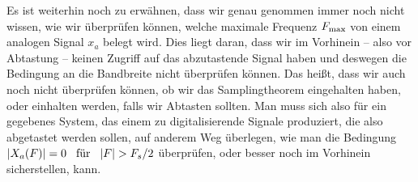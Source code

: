 Es ist weiterhin noch zu erwähnen, dass wir genau genommen immer noch nicht wissen, wie wir überprüfen können, welche maximale Frequenz $F_{\rm max}$ von einem analogen Signal $x_a$ belegt wird.
Dies liegt daran, dass wir im Vorhinein -- also vor Abtastung -- keinen Zugriff auf das abzutastende Signal haben und deswegen die Bedingung an die Bandbreite nicht überprüfen können.
Das heißt, dass wir auch noch nicht überprüfen können, ob wir das Samplingtheorem eingehalten haben, oder einhalten werden, falls wir Abtasten sollten.
Man muss sich also für ein gegebenes System, das einem zu digitalisierende Signale produziert, die also abgetastet werden sollen, auf anderem Weg überlegen, wie man die Bedingung ${\left| X_a(F) \right|} = 0 {\hspace{3mm} \text{für} \hspace{3mm}} {\left| F \right|} > F_s/2$ überprüfen, oder besser noch im Vorhinein sicherstellen, kann.

\FloatBarrier
